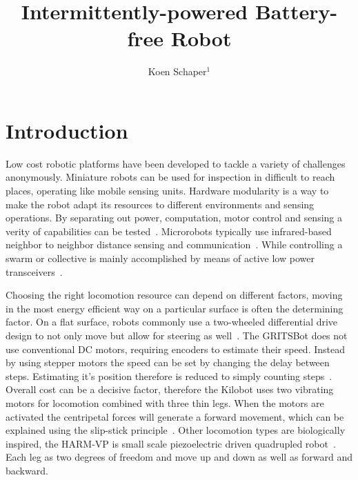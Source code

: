 \documentclass[letterpaper, 10 pt, conference]{ieeeconf}  %
\title{\LARGE \bf
Intermittently-powered Battery-free Robot
}
\author{Koen Schaper$^{1}$ %
}
\begin{document}
\maketitle
\thispagestyle{empty}
\pagestyle{empty}






\section{Introduction}



Low cost robotic platforms have been developed to tackle a variety of challenges anonymously.
Miniature robots can be used for inspection in difficult to reach places, operating like mobile sensing units.
Hardware modularity is a way to make the robot adapt its resources to different environments and sensing operations.
By separating out power, computation, motor control and sensing a verity of capabilities can be tested~\cite{sabelhaus_icra_2013, pickem_icra_2015, kim_iros_2016}.
Microrobots typically use infrared-based neighbor to neighbor distance sensing and communication~\cite{rubenstein_icra_2012, pickem_icra_2015, kim_iros_2016}.
While controlling a swarm or collective is mainly accomplished by means of active low power transceivers~\cite{sabelhaus_icra_2013, pickem_icra_2015, kim_iros_2016}. 


Choosing the right locomotion resource can depend on different factors, moving in the most energy efficient way on a particular surface is often the determining factor.
On a flat surface, robots commonly use a two-wheeled differential drive design to not only move but allow for steering as well~\cite{sabelhaus_icra_2013, pickem_icra_2015}.
The GRITSBot does not use conventional DC motors, requiring encoders to estimate their speed. 
Instead by using stepper motors the speed can be set by changing the delay between steps. 
Estimating it's position therefore is reduced to simply counting steps~\cite{pickem_icra_2015}.  
Overall cost can be a decisive factor, therefore the Kilobot uses two vibrating motors for locomotion combined with three thin legs.
When the motors are activated the centripetal forces will generate a forward movement, which can be explained using the slip-stick principle~\cite{rubenstein_icra_2012}.
Other locomotion types are biologically inspired, the HARM-VP is small scale piezoelectric driven quadrupled robot~\cite{baisch_iros_2013}.
Each leg as two degrees of freedom and move up and down as well as forward and backward.
\end{document}
